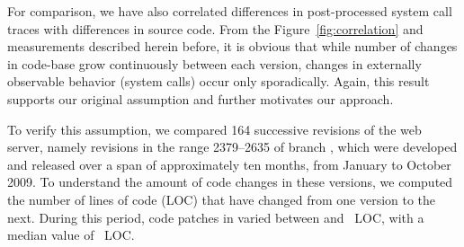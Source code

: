 For comparison, we have also correlated differences in post-processed system
call traces with differences in source code. From the
Figure~\ref{fig:correlation} and measurements described herein before, it is
obvious that while number of changes in code-base grow continuously between
each version, changes in externally observable behavior (\ie system calls)
occur only sporadically. Again, this result supports our original assumption
and further motivates our approach.


To verify this assumption, we compared 164 successive revisions of the
\lighttpd web server, namely revisions in the range 2379--2635 of
branch , which were developed and released
over a span of approximately ten months, from January to October 2009.
To understand the amount of code changes in these versions, we 
computed the number of lines of code (LOC) that have changed from
one version to the next.  
During this period, code patches in \lighttpd varied between
\lighttpdMinPatch and \lighttpdMaxPatch~LOC, with a median value of 
\lighttpdMedPatch~LOC.




